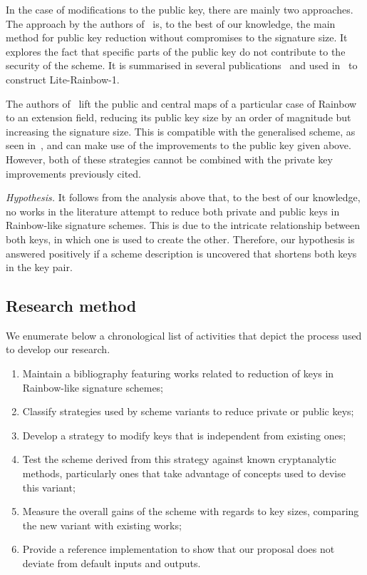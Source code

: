 \documentclass[draft, 12pt, a4paper, oneside]{memoir}
\begin{document}
In the case of modifications to the public key, there are mainly two approaches.
The approach by the authors of~\cite{Petzoldt:201006:inproc} is, to the best of 
our knowledge, the main method for public key reduction without compromises to
the signature size. It explores the fact that specific parts of the public key
do not contribute to the security of the scheme. It is summarised in several
publications~\cite{Petzoldt:201012:inproc,Petzoldt:201103:inproc,Petzoldt:201211:inproc,Petzoldt:201307:phd}
and used in~\cite{Shim:201512:inproc} to construct Lite-Rainbow-1.

The authors of~\cite{Szepieniec:201706:inproc} lift the public and central maps
of a particular case of Rainbow to an extension field, reducing its public 
key size by an order of magnitude but increasing the signature size. This is 
compatible with the generalised scheme, as seen in~\cite{Beullens:201706:msc,Beullens:201712:inproc},
and can make use of the improvements to the public key given above. However,
both of these strategies cannot be combined with the private key improvements
previously cited. 

\emph{Hypothesis.} It follows from the analysis above that, to the best of our knowledge, no works in the literature attempt to reduce both private and public keys in Rainbow-like signature schemes. This is due to the intricate relationship between both keys, in which one is used to create the other. Therefore, our hypothesis is answered positively if a scheme description is uncovered that shortens both keys in the key pair.

\subsection{Research method}

We enumerate below a chronological list of activities that depict the process used to develop our research.

\begin{enumerate}[label=(\roman*), itemsep=1pt]
    \item Maintain a bibliography featuring works related to reduction of keys in Rainbow-like signature schemes;
    \item Classify strategies used by scheme variants to reduce private or public keys;
    \item Develop a strategy to modify keys that is independent from existing ones;
    \item Test the scheme derived from this strategy against known cryptanalytic methods, particularly ones that take advantage of concepts used to devise this variant;
    \item Measure the overall gains of the scheme with regards to key sizes, comparing the new variant with existing works;
    \item Provide a reference implementation to show that our proposal does not deviate from default inputs and outputs.
\end{enumerate}



\end{document}
